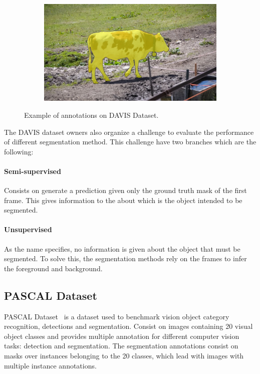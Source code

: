 \begin{figure}
\begin{subfigure}{.25\textwidth}
\end{subfigure}%
\begin{subfigure}{.25\textwidth}
  \includegraphics[width=1.\linewidth]{figures/davis_dataset/cow.jpg}
\end{subfigure}
\caption{Example of annotations on DAVIS Dataset.}
\label{fig:davis}
\end{figure}


The DAVIS dataset owners also organize a challenge to evaluate the performance of different segmentation method.
This challenge have two branches which are the following:

\paragraph{Semi-supervised}

Consists on generate a prediction given only the ground truth mask of the first frame.
This gives information to the about which is the object intended to be segmented.

\paragraph{Unsupervised}

As the name specifies, no information is given about the object that must be segmented.
To solve this, the segmentation methods rely on the frames to infer the foreground and background.

\subsection{PASCAL Dataset}

PASCAL Dataset~\cite{Everingham10} is a dataset used to benchmark vision object category recognition, detections and segmentation.
Consist on images containing 20 visual object classes and provides multiple annotation for different computer vision tasks: detection and segmentation.
The segmentation annotations consist on masks over instances belonging to the 20 classes, which lead with images with multiple instance annotations.

